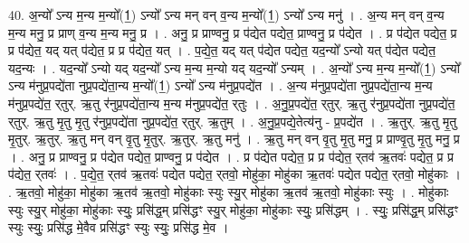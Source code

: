 \documentclass[17pt]{extarticle}
\begin{document}
40. अ॒न्यो᳚ ऽन्य म॒न्य म॒न्यो᳚(1॒) ऽन्यो᳚ ऽन्य मन् वन् व॒न्य म॒न्यो᳚(1॒) ऽन्यो᳚ ऽन्य मनु॑ । . अ॒न्य मन् वन् व॒न्य म॒न्य मनु॒ प्र प्राण् व॒न्य म॒न्य मनु॒ प्र । . अनु॒ प्र प्राण्वनु॒ प्र प॑द्येत पद्येत॒ प्राण्वनु॒ प्र प॑द्येत । . प्र प॑द्येत पद्येत॒ प्र प्र प॑द्येत॒ यद् यत् प॑द्येत॒ प्र प्र प॑द्येत॒ यत् । . प॒द्ये॒त॒ यद् यत् प॑द्येत पद्येत॒ यद॒न्यो᳚ ऽन्यो यत् प॑द्येत पद्येत॒ यद॒न्यः । . यद॒न्यो᳚ ऽन्यो यद् यद॒न्यो᳚ ऽन्य म॒न्य म॒न्यो यद् यद॒न्यो᳚ ऽन्यम् । . अ॒न्यो᳚ ऽन्य म॒न्य म॒न्यो᳚(1॒) ऽन्यो᳚ ऽन्य म॑नुप्र॒पद्ये॑ता नुप्र॒पद्ये॑ता॒न्य म॒न्यो᳚(1॒) ऽन्यो᳚ ऽन्य म॑नुप्र॒पद्ये॑त । . अ॒न्य म॑नुप्र॒पद्ये॑ता नुप्र॒पद्ये॑ता॒न्य म॒न्य म॑नुप्र॒पद्ये॑त॒ र्‌तुर्. ऋ॒तु र॑नुप्र॒पद्ये॑ता॒न्य म॒न्य म॑नुप्र॒पद्ये॑त॒ र्‌तुः । . अ॒नु॒प्र॒पद्ये॑त॒ र्‌तुर्. ऋ॒तु र॑नुप्र॒पद्ये॑ता नुप्र॒पद्ये॑त॒ र्‌तुर्. ऋ॒तु मृ॒तु मृ॒तु र॑नुप्र॒पद्ये॑ता नुप्र॒पद्ये॑त॒ र्‌तुर्. ऋ॒तुम् । . अ॒नु॒प्र॒पद्ये॒तेत्य॑नु - प्र॒पद्ये॑त । . ऋ॒तुर्. ऋ॒तु मृ॒तु मृ॒तुर्. ऋ॒तुर्. ऋ॒तु मन् वन् वृ॒तु मृ॒तुर्. ऋ॒तुर्. ऋ॒तु मनु॑ । . ऋ॒तु मन् वन् वृ॒तु मृ॒तु मनु॒ प्र प्राण्वृ॒तु मृ॒तु मनु॒ प्र । . अनु॒ प्र प्राण्वनु॒ प्र प॑द्येत पद्येत॒ प्राण्वनु॒ प्र प॑द्येत । . प्र प॑द्येत पद्येत॒ प्र प्र प॑द्येत॒ र्‌तव॑ ऋ॒तवः॑ पद्येत॒ प्र प्र प॑द्येत॒ र्‌तवः॑ । . प॒द्ये॒त॒ र्‌तव॑ ऋ॒तवः॑ पद्येत पद्येत॒ र्‌तवो॒ मोहु॑का॒ मोहु॑का ऋ॒तवः॑ पद्येत पद्येत॒ र्‌तवो॒ मोहु॑काः । . ऋ॒तवो॒ मोहु॑का॒ मोहु॑का ऋ॒तव॑ ऋ॒तवो॒ मोहु॑काः स्युः स्यु॒र् मोहु॑का ऋ॒तव॑ ऋ॒तवो॒ मोहु॑काः स्युः । . मोहु॑काः स्युः स्यु॒र् मोहु॑का॒ मोहु॑काः स्युः॒ प्रसि॑द्ध॒म् प्रसि॑द्धꣳ स्यु॒र् मोहु॑का॒ मोहु॑काः स्युः॒ प्रसि॑द्धम् । . स्युः॒ प्रसि॑द्ध॒म् प्रसि॑द्धꣳ स्युः स्युः॒ प्रसि॑द्ध मे॒वैव प्रसि॑द्धꣳ स्युः स्युः॒ प्रसि॑द्ध मे॒व । \newline
\pagebreak
{}
\end{document}
